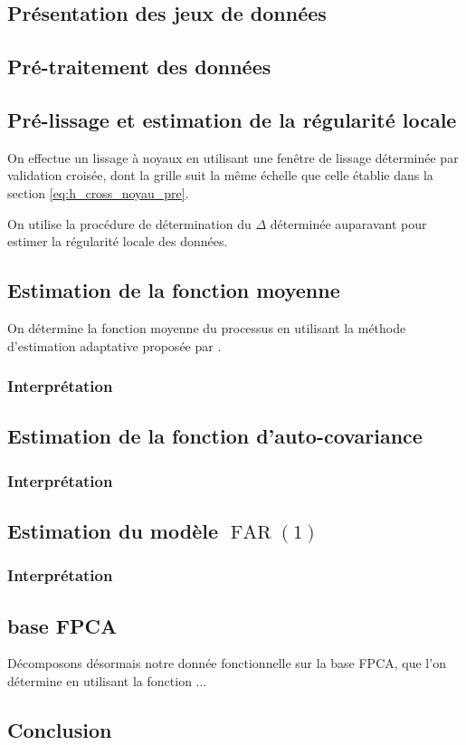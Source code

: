 \subsection{Présentation des jeux de données}

\subsection{Pré-traitement des données}

\subsection{Pré-lissage et estimation de la régularité locale}

On effectue un lissage à noyaux en utilisant une fenêtre de lissage déterminée par validation croisée, dont la grille suit la même échelle que celle établie dans la section \ref{eq:h_cross_noyau_pre}.


On utilise la procédure de détermination du $\Delta$ déterminée auparavant pour estimer la régularité locale des données.

\subsection{Estimation de la fonction moyenne}

On détermine la fonction moyenne du processus en utilisant la méthode d'estimation adaptative proposée par \cite{golovkine2021adaptive}.

\subsubsection{Interprétation}

\subsection{Estimation de la fonction d'auto-covariance}

\subsubsection{Interprétation}

\subsection{Estimation du modèle $\operatorname{FAR}(1)$}

\subsubsection{Interprétation}

\subsection{base FPCA}

Décomposons désormais notre donnée fonctionnelle sur la base FPCA, que l'on détermine en utilisant la fonction ...

\subsection{Conclusion}
